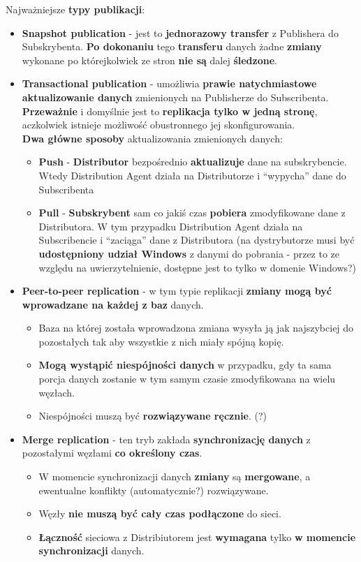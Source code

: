 \documentclass[a4paper]{article}
\begin{document}
    Najważniejsze \textbf{typy publikacji}:
    \begin{itemize}
        \item \textbf{Snapshot publication} - jest to \textbf{jednorazowy transfer} z Publishera do Subskrybenta. \textbf{Po dokonaniu} tego \textbf{transferu} danych żadne \textbf{zmiany} wykonane po którejkolwiek ze stron \textbf{nie są} dalej \textbf{śledzone}.
        \item \textbf{Transactional publication} - umożliwia \textbf{prawie natychmiastowe aktualizowanie danych} zmienionych na Publisherze do Subscribenta. \textbf{Przeważnie} i domyślnie jest to \textbf{replikacja tylko w jedną stronę}, aczkolwiek istnieje możliwość obustronnego jej skonfigurowania.\\
        \textbf{Dwa główne sposoby} aktualizowania zmienionych danych:
        \begin{itemize}
            \item \textbf{Push} - \textbf{Distributor} bezpośrednio \textbf{aktualizuje} dane na subskrybencie. Wtedy Distribution Agent działa na Distributorze i ``wypycha'' dane do Subscribenta
            \item \textbf{Pull} - \textbf{Subskrybent} sam co jakiś czas \textbf{pobiera} zmodyfikowane dane z Distributora. W tym przypadku Distribution Agent działa na Subscribencie i ``zaciąga'' dane z Distributora (na dystrybutorze musi być \textbf{udostępniony udział Windows} z danymi do pobrania - przez to ze względu na uwierzytelnienie, dostępne jest to tylko w domenie Windows?)
        \end{itemize}
        \item \textbf{Peer-to-peer replication} - w tym typie replikacji \textbf{zmiany mogą być wprowadzane na każdej z baz} danych.
        \begin{itemize}
            \item Baza na której została wprowadzona zmiana wysyła ją jak najszybciej do pozostałych tak aby wszystkie z nich miały spójną kopię.
            \item \textbf{Mogą wystąpić niespójności danych} w przypadku, gdy ta sama porcja danych zostanie w tym samym czasie zmodyfikowana na wielu węzłach.
            \item Niespójności muszą być \textbf{rozwiązywane ręcznie}. (?)
        \end{itemize}
        \item \textbf{Merge replication} - ten tryb zakłada \textbf{synchronizację danych} z pozostałymi węzłami \textbf{co określony czas}.
        \begin{itemize}
            \item W momencie synchronizacji danych \textbf{zmiany} są \textbf{mergowane}, a ewentualne konflikty (automatycznie?) rozwiązywane.
            \item Węzły \textbf{nie muszą być cały czas podłączone} do sieci.
            \item \textbf{Łączność} sieciowa z Distribiutorem jest \textbf{wymagana} tylko \textbf{w momencie synchronizacji} danych.
        \end{itemize}
    \end{itemize}
\end{document}
